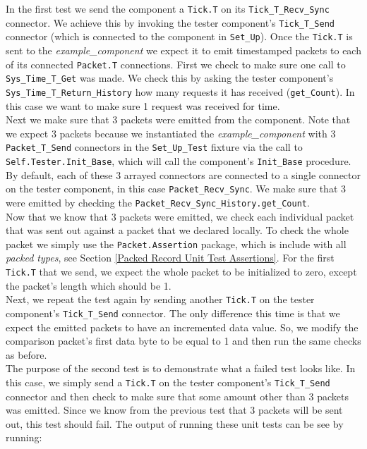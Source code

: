 In the first test we send the component a \texttt{Tick.T} on its \texttt{Tick\_T\_Recv\_Sync} connector. We achieve this by invoking the tester component's \texttt{Tick\_T\_Send} connector (which is connected to the component in \texttt{Set\_Up}). Once the \texttt{Tick.T} is sent to the \textit{example\_component} we expect it to emit timestamped packets to each of its connected \texttt{Packet.T} connections. First we check to make sure one call to \texttt{Sys\_Time\_T\_Get} was made. We check this by asking the tester component's \texttt{Sys\_Time\_T\_Return\_History} how many requests it has received (\texttt{get\_Count}). In this case we want to make sure 1 request was received for time.  \\

Next we make sure that 3 packets were emitted from the component. Note that we expect 3 packets because we instantiated the \textit{example\_component} with 3 \texttt{Packet\_T\_Send} connectors in the \texttt{Set\_Up\_Test} fixture via the call to \texttt{Self.Tester.Init\_Base}, which will call the component's \texttt{Init\_Base} procedure. By default, each of these 3 arrayed connectors are connected to a single connector on the tester component, in this case \texttt{Packet\_Recv\_Sync}. We make sure that 3 were emitted by checking the \texttt{Packet\_Recv\_Sync\_History.get\_Count}. \\

Now that we know that 3 packets were emitted, we check each individual packet that was sent out against a packet that we declared locally. To check the whole packet we simply use the \texttt{Packet.Assertion} package, which is include with all \textit{packed types}, see Section \ref{Packed Record Unit Test Assertions}. For the first \texttt{Tick.T} that we send, we expect the whole packet to be initialized to zero, except the packet's length which should be 1. \\

Next, we repeat the test again by sending another \texttt{Tick.T} on the tester component's \texttt{Tick\_T\_Send} connector. The only difference this time is that we expect the emitted packets to have an incremented data value. So, we modify the comparison packet's first data byte to be equal to 1 and then run the same checks as before. \\

The purpose of the second test is to demonstrate what a failed test looks like. In this case, we simply send a \texttt{Tick.T} on the tester component's \texttt{Tick\_T\_Send} connector and then check to make sure that some amount other than 3 packets was emitted. Since we know from the previous test that 3 packets will be sent out, this test should fail. The output of running these unit tests can be see by running:

